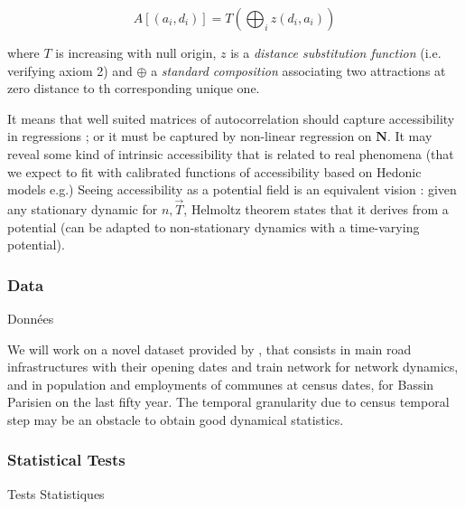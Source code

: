 \[
A\left[(a_i,d_i)\right] = T\left(\bigoplus_i z(d_i,a_i)\right)
\]

where $T$ is increasing with null origin, $z$ is a \emph{distance substitution function} (i.e. verifying axiom 2) and $\oplus$ a \emph{standard composition} associating two attractions at zero distance to th corresponding unique one. 

It means that well suited matrices of autocorrelation should capture accessibility in regressions ; 
 or it must be captured by non-linear regression on $\mathbf{N}$. It may reveal some kind of intrinsic accessibility that is related to real phenomena (that we expect to fit with calibrated functions of accessibility based on Hedonic models e.g.) Seeing accessibility as a potential field is an equivalent vision : given any stationary dynamic for $n,\vec{T}$, Helmoltz theorem states that it derives from a potential (can be adapted to non-stationary dynamics with a time-varying potential).




\subsubsection{Data}{Données}

We will work on a novel dataset provided by , that consists in main road infrastructures with their opening dates and train network for network dynamics, and in population and employments of communes at census dates, for Bassin Parisien on the last fifty year. The temporal granularity due to census temporal step may be an obstacle to obtain good dynamical statistics. 


\subsubsection{Statistical Tests}{Tests Statistiques}



